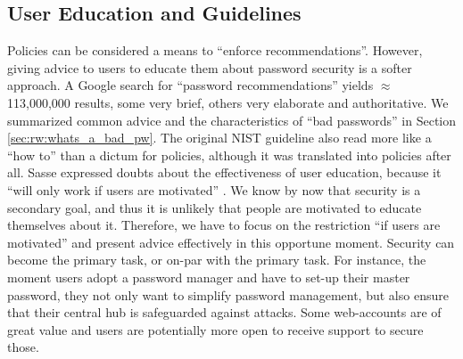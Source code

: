 	\subsection{User Education and Guidelines}\label{sec:rw:advice_guidance}
	Policies can be considered a means to ``enforce recommendations''. However, giving advice to users to educate them about password security is a softer approach. A Google search for ``password recommendations'' yields $\approx$ 113,000,000 results, some very brief, others very elaborate and authoritative. We summarized common advice and the characteristics of ``bad passwords'' in Section \ref{sec:rw:whats_a_bad_pw}. The original \gls{NIST} guideline also read more like a ``how to'' than a dictum for policies, although it was translated into policies after all. Sasse \etal expressed doubts about the effectiveness of user education, because it ``will only work if users are motivated'' \cite{Sasse2001WeakestLink}. We know by now that security is a secondary goal, and thus it is unlikely that people are motivated to educate themselves about it. Therefore, we have to focus on the restriction ``if users are motivated'' and present advice effectively in this opportune moment. Security can become the primary task, or on-par with the primary task. For instance, the moment users adopt a password manager and have to set-up their master password, they not only want to simplify password management, but also ensure that their central hub is safeguarded against attacks. Some web-accounts are of great value and users are potentially more open to receive support to secure those. 
	
	
